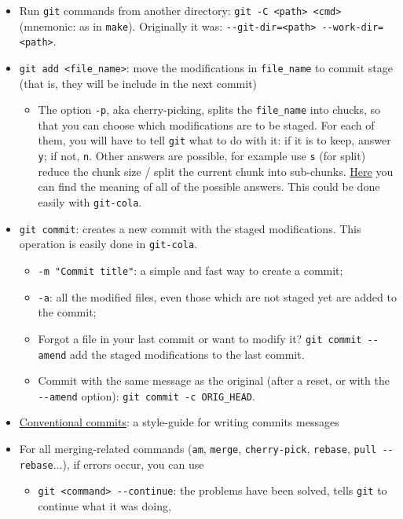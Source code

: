 \documentclass[a4paper,12pt,%
              final%
              ]{article}
\begin{document}
\begin{itemize}
  \item Run \verb|git| commands from another directory: \verb|git -C <path> <cmd>| (mnemonic: as in \verb|make|). Originally it was: \verb|--git-dir=<path> --work-dir=<path>|.
  \item \verb|git add <file_name>|: move the modifications in \verb|file_name| to commit stage (that is, they will be include in the next commit)
    \begin{itemize}
      \item The option \texttt{-p}, aka cherry-picking, splits the \verb|file_name| into chucks, so that you can choose which modifications are to be staged. For each of them, you will have to tell \texttt{git} what to do with it: if it is to keep, answer \texttt{y}; if not, \texttt{n}. Other answers are possible, for example use \texttt{s} (for split) reduce the chunk size / split the current chunk into sub-chunks. \href{https://stackoverflow.com/questions/1122210/can-i-modify-git-adds-hunk-size}{Here} you can find the meaning of all of the possible answers. This could be done easily with \texttt{git-cola}.
    \end{itemize}
  \item \texttt{git commit}: creates a new commit with the staged modifications. This operation is easily done in \texttt{git-cola}.
    \begin{itemize}
      \item \verb|-m "Commit title"|: a simple and fast way to create a commit;
      \item \texttt{-a}: all the modified files, even those which are not staged yet are added to the commit;
      \item Forgot a file in your last commit or want to modify it? \verb|git commit --amend| add the staged modifications to the last commit.
      \item Commit with the same message as the original (after a reset, or with the \verb|--amend| option): \verb|git commit -c ORIG_HEAD|.
    \end{itemize}
  \item \href{https://www.conventionalcommits.org/en/v1.0.0/}{Conventional commits}: a style-guide for writing commits messages
  \item For all merging-related commands (\texttt{am}, \texttt{merge}, \texttt{cherry-pick}, \texttt{rebase}, \verb|pull --rebase|...), if errors occur, you can use
    \begin{itemize}
      \item \verb|git <command> --continue|: the problems have been solved, tells \texttt{git} to continue what it was doing,

\end{itemize}
\end{itemize}
\end{document}
